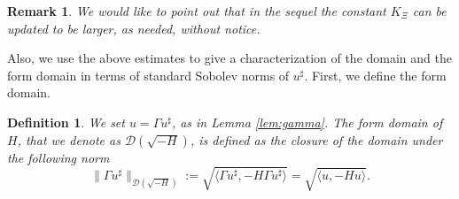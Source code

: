 \documentclass[11pt, oneside]{article}   	%
\newcommand{\assign}{:=}
\newtheorem{definition}[theorem]{Definition}
\newtheorem{remark}[theorem]{Remark}
\newcommand{\ED}{\mathscr{D} ( \sqrt{-H})}
\begin{document}
\begin{remark}\upshape
We would like to point out that in the sequel the constant $K_\Xi$ can be updated to be larger, as needed, without notice.
\end{remark}

Also, we use the above  estimates to give a characterization of the domain and the form domain in terms of standard Sobolev norms of $u^\sharp$.  First, we define the form domain.

\begin{definition} \label{def:energySp2d}
	We set $u= \Gamma u^{\sharp}$, as in Lemma \eqref{lem:gamma}. The form domain of $H$, that we denote as $\ED$, is defined as the closure of the domain under the following norm
		\[ \| \Gamma u^{\sharp} \|_{\ED} \assign
	\sqrt{ \langle \Gamma u^{\sharp}, -{H} \Gamma u^{\sharp} \rangle} = \sqrt{ \langle u, -{H} u \rangle}
	. \]
\end{definition}
\end{document}
